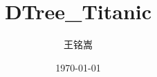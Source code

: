 \documentclass{article}
\title{DTree\_Titanic}
\author{王铭嵩}
\date{\today}
\begin{document}
\maketitle
\newpage
\
\end{document}
